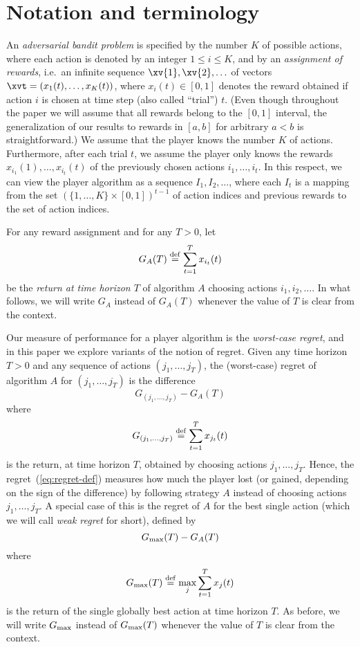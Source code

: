 \documentclass[12pt]{article}
\newcommand{\defeq}{\stackrel{\rm def}{=}}
\newcommand{\x}[2]{x_{#1}({#2})}
\renewcommand{\i}[1]{i_{#1}}
\newcommand{\xit}{\x{\i{t}}{t}}
\newcommand{\Gbest}{G_{\rm max}}
\begin{document}
\section{Notation and terminology}
\label{s:notation}
An {\em adversarial bandit problem} is specified by the number $K$ of possible
actions, where each action is denoted by an integer $1 \leq i \leq K$,
and by an {\em assignment of rewards}, i.e.\ an infinite sequence $\xv{1},\xv{2},\ldots$
of vectors $\xvt=(\x{1}{t},\ldots,\x{K}{t})$, where $\x{i}{t} \in [0,1]$ denotes
the reward obtained if action $i$ is chosen at time step (also called ``trial'')
$t$.
(Even though throughout the paper we will assume that all rewards belong to
the $[0,1]$ interval, the generalization of our results to rewards in $[a,b]$
for arbitrary $a < b$ is straightforward.)
We assume that the player knows the number $K$ of actions. Furthermore,
after each trial $t$, we assume the player only knows the rewards
$\x{\i{1}}{1},\ldots,\x{\i{t}}{t}$ of the previously chosen actions $i_1,\ldots,i_t$.
In this respect, we can view the player algorithm as a sequence $I_1,I_2,\ldots$,
where each $I_t$ is a mapping from the set $(\{1,\ldots,K\} \times [0,1])^{t-1}$
of action indices and previous rewards to the set of action indices.

For any reward assignment and for any $T > 0$, let
\[
        G_A(T) \defeq \sum_{t=1}^T \xit
\]
be the {\em return at time horizon $T$} of algorithm $A$ choosing actions
$\i{1},\i{2},\ldots$.
In what follows, we will write $G_A$ instead of $G_A(T)$ whenever the value of $T$
is clear from the context.

Our measure of performance for a player algorithm is the {\em worst-case regret},
and in this paper we explore variants of the notion of regret.
Given any time horizon $T>0$ and any sequence of actions $(j_1,\ldots,j_T)$,
the (worst-case) regret of algorithm $A$ for $(j_1,\ldots,j_T)$ is the difference
\begin{equation}
\label{eq:regret-def}
        G_{(j_1,\ldots,j_T)} - G_A(T)
\end{equation}
where
\[
        G_{(j_1,\ldots,j_T)} \defeq \sum_{t=1}^T \x{j_t}{t}
\]
is the return, at time horizon $T$, obtained by choosing actions $j_1,\ldots,j_T$.
Hence, the regret~(\ref{eq:regret-def}) measures how much the player lost
(or gained, depending on the sign of the difference) by following
strategy $A$ instead of choosing actions $j_1,\ldots,j_T$.
A special case of this is the regret of $A$ for the best single action
(which we will call {\em weak regret} for short), defined by
\[
        \Gbest(T) - G_A(T)
\]
where
\[
        \Gbest(T) \defeq \max_j \sum_{t=1}^T \x{j}{t}
\]
is the return of the single globally best action at time horizon $T$.
As before, we will write $\Gbest$ instead of $\Gbest(T)$ whenever the value of $T$
is clear from the context.
\end{document}
